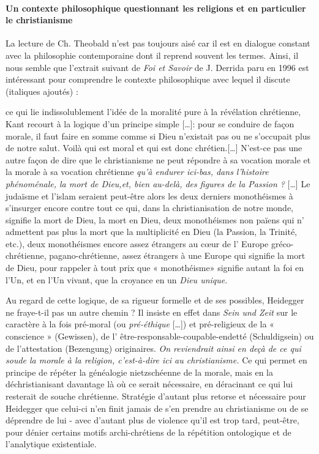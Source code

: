 \paragraph{Un contexte philosophique questionnant les religions et en particulier le christianisme } La lecture de Ch. Theobald n'est pas toujours aisé car il est en dialogue constant avec la philosophie contemporaine dont il reprend souvent les termes. Ainsi, il nous semble que l'extrait suivant de \textit{Foi et Savoir} de J. Derrida paru en 1996 est intéressant pour comprendre le contexte philosophique avec lequel il discute (italiques ajoutés) : 

\begin{singlequote} 
[Dans] ce qui lie indissolublement l'idée de la moralité pure à la révélation chrétienne, Kant recourt à la logique d'un principe simple [\ldots]: pour se conduire de façon morale, il faut faire en somme comme si Dieu n'existait pas ou ne s'occupait plus de notre salut. Voilà qui est moral et qui est donc chrétien.[\ldots] N'est-ce pas une autre façon de dire que le christianisme ne peut répondre à sa vocation morale et la morale à sa vocation chrétienne \textit{qu'à endurer ici-bas, dans l'histoire phénoménale, la mort de Dieu,et, bien au-delà, des figures de la Passion ?}  [\ldots] Le judaïsme et l'islam seraient peut-être alors les deux derniers monothéismes à s'insurger encore contre tout ce qui, dans la christianisation de notre monde, signifie la mort de Dieu, la mort en Dieu, deux monothéismes non païens qui n' admettent pas plus la mort que la multiplicité en Dieu (la Passion, la Trinité, etc.), deux monothéismes encore assez étrangers au cœur de l' Europe gréco-chrétienne, pagano-chrétienne, assez étrangers à une Europe qui signifie la mort de Dieu, pour rappeler à tout prix que « monothéisme» signifie autant la foi en l'Un, et en l'Un vivant, que la croyance en un \textit{Dieu unique}.

Au regard de cette logique, de sa rigueur formelle et de ses possibles, Heidegger ne fraye-t-il pas un autre chemin ? Il insiste en effet dans \textit{Sein und Zeit} sur le caractère à la fois pré-moral (ou \emph{pré-éthique} [\ldots])  et pré-religieux de la « conscience » (Gewissen), de l' être-responsable-coupable-endetté (Schuldigsein) ou de l'attestation (Bezengung) originaires. \textit{On reviendrait ainsi en deçà de ce qui soude la morale à la religion, c'est-à-dire ici au christianisme. }Ce qui permet en principe de répéter la généalogie nietzschéenne de la morale, mais en la déchristianisant davantage là où ce serait nécessaire, en déracinant ce qui lui resterait de souche chrétienne. Stratégie d'autant plus retorse et nécessaire pour Heidegger que celui-ci n'en finit jamais de s'en prendre au christianisme ou de se déprendre de lui - avec d'autant plus de violence qu'il est trop tard, peut-être, pour dénier certains motifs archi-chrétiens de la répétition ontologique et de l'analytique existentiale.     \cite[p. 22]{derrida_foi_2001}
\end{singlequote}
